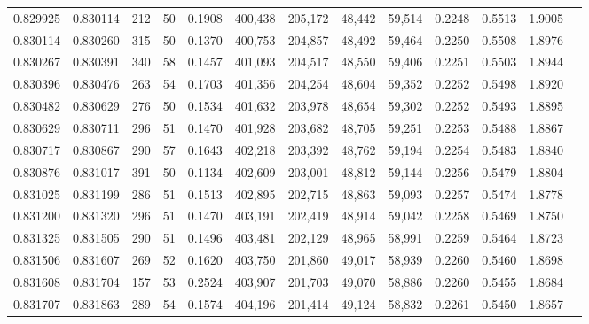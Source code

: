 \begin{tabular}{rrrrrrrrrrrrr}
0.829925 & 0.830114 &   212 &  50 &                                     0.1908 & 400,438 & 205,172 &  48,442 &  59,514 & 0.2248 & 0.5513 & 1.9005 \\
0.830114 & 0.830260 &   315 &  50 &                                     0.1370 & 400,753 & 204,857 &  48,492 &  59,464 & 0.2250 & 0.5508 & 1.8976 \\
0.830267 & 0.830391 &   340 &  58 &                                     0.1457 & 401,093 & 204,517 &  48,550 &  59,406 & 0.2251 & 0.5503 & 1.8944 \\
0.830396 & 0.830476 &   263 &  54 &                                     0.1703 & 401,356 & 204,254 &  48,604 &  59,352 & 0.2252 & 0.5498 & 1.8920 \\
0.830482 & 0.830629 &   276 &  50 &                                     0.1534 & 401,632 & 203,978 &  48,654 &  59,302 & 0.2252 & 0.5493 & 1.8895 \\
0.830629 & 0.830711 &   296 &  51 &                                     0.1470 & 401,928 & 203,682 &  48,705 &  59,251 & 0.2253 & 0.5488 & 1.8867 \\
0.830717 & 0.830867 &   290 &  57 &                                     0.1643 & 402,218 & 203,392 &  48,762 &  59,194 & 0.2254 & 0.5483 & 1.8840 \\
0.830876 & 0.831017 &   391 &  50 &                                     0.1134 & 402,609 & 203,001 &  48,812 &  59,144 & 0.2256 & 0.5479 & 1.8804 \\
0.831025 & 0.831199 &   286 &  51 &                                     0.1513 & 402,895 & 202,715 &  48,863 &  59,093 & 0.2257 & 0.5474 & 1.8778 \\
0.831200 & 0.831320 &   296 &  51 &                                     0.1470 & 403,191 & 202,419 &  48,914 &  59,042 & 0.2258 & 0.5469 & 1.8750 \\
0.831325 & 0.831505 &   290 &  51 &                                     0.1496 & 403,481 & 202,129 &  48,965 &  58,991 & 0.2259 & 0.5464 & 1.8723 \\
0.831506 & 0.831607 &   269 &  52 &                                     0.1620 & 403,750 & 201,860 &  49,017 &  58,939 & 0.2260 & 0.5460 & 1.8698 \\
0.831608 & 0.831704 &   157 &  53 &                                     0.2524 & 403,907 & 201,703 &  49,070 &  58,886 & 0.2260 & 0.5455 & 1.8684 \\
0.831707 & 0.831863 &   289 &  54 &                                     0.1574 & 404,196 & 201,414 &  49,124 &  58,832 & 0.2261 & 0.5450 & 1.8657 \\

\end{tabular}
